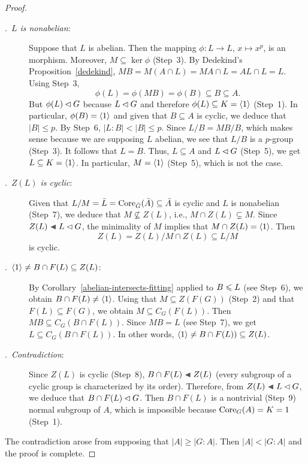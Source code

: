 \begin{proof}
\begin{description}
    \item[.~\textit{$L$ is nonabelian\/}:] Suppose that $L$ is abelian. Then the mapping $\phi\colon L\to L$, $x\mapsto x^p$, is an morphism. Moreover, $M\subseteq\ker\phi$ (Step~3). By Dedekind's Proposition~\ref{dedekind}, $MB=M(A\cap L)=MA\cap L=AL\cap L= L$. Using Step~3,
    $$
        \phi(L)=\phi(MB)=\phi(B)\subseteq B\subseteq A.
    $$
    But $\phi(L)\lhd G$ because $L\lhd G$ and therefore $\phi(L)\subseteq K=\langle1\rangle$ (Step~1). In particular, $\phi(B)=\langle1\rangle$ and given that $B\subseteq A$ is cyclic, we deduce that $|B|\le p$. By Step~6, $|L:B|<|B|\le p$. Since $L/B=MB/B$, which makes sense because we are supposing $L$ abelian, we see that $L/B$ is a $p$-group (Step~3). It follows that $L=B$. Thus, $L\subseteq A$ and $L\lhd G$ (Step~5), we get $L\subseteq K=\langle1\rangle$. In particular, $M=\langle1\rangle$ (Step~5), which is not the case.

    \item[.~\textit{$Z(L)$ is cyclic\/}:] Given that $L/M=\bar L={\rm Core}_{\bar G}(\bar A)\subseteq\bar A$ is cyclic and $L$ is nonabelian (Step~7), we deduce that $M\not\subseteq Z(L)$, i.e., $M\cap Z(L)\varsubsetneq M$. Since $Z(L)\ch L\normal G$, the minimality of $M$ implies that $M\cap Z(L)=\langle1\rangle$. Then
    $$
        Z(L)=Z(L)/M\cap Z(L)\subseteq L/M
    $$
    is cyclic.
    
    \item[.~\textit{$\langle1\rangle\ne B\cap F(L)\subseteq Z(L)$\/}:] By Corollary~\ref{abelian-intersects-fitting} applied to $B\leqslant L$ (see Step~6), we obtain $B\cap F(L)\ne\langle1\rangle$. Using that $M\subseteq Z(F(G))$ (Step~2) and that $F(L)\subseteq F(G)$, we obtain $M\subseteq C_G(F(L))$. Then $MB\subseteq C_G(B\cap F(L))$. Since $MB=L$ (see Step~7), we get $L\subseteq C_G(B\cap F(L))$. In other words, $\langle1\rangle\ne B\cap F(L))\subseteq Z(L)$.

    \item[.~\textit{Contradiction\/}:] Since $Z(L)$ is cyclic (Step~8), $B\cap F(L)\ch Z(L)$ (every subgroup of a cyclic group is characterized by its order). Therefore, from $Z(L)\ch L\normal G$, we deduce that $B\cap F(L)\lhd G$. Then $B\cap F(L)$ is a nontrivial (Step~9) normal subgroup of $A$, which is impossible because ${\rm Core}_G(A)=K=1$ (Step~1).
\end{description}
The contradiction arose from supposing that $|A|\ge|G:A|$. Then $|A|<|G:A|$ and the proof is complete.  \end{proof}

